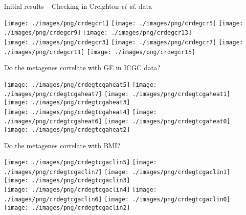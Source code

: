\documentclass[handout]{beamer}
\begin{document}
\begin{frame}{Initial results -- Checking in Creighton \textit{et al.} data}
	\begin{adjustwidth}{-1.5em}{-1.5em}
		\texttt{[image: ./images/png/crdegcr1]}
		\texttt{[image: ./images/png/crdegcr5]}
		\texttt{[image: ./images/png/crdegcr9]}
		\texttt{[image: ./images/png/crdegcr13]}\\
		\texttt{[image: ./images/png/crdegcr3]}
		\texttt{[image: ./images/png/crdegcr7]}
		\texttt{[image: ./images/png/crdegcr11]}
		\texttt{[image: ./images/png/crdegcr15]}
	\end{adjustwidth}
\end{frame}

\begin{frame}{Do the metagenes correlate with GE in ICGC data?}
	\begin{adjustwidth}{-1.5em}{-1.5em}
		\texttt{[image: ./images/png/crdegtcgaheat5]}
		\texttt{[image: ./images/png/crdegtcgaheat7]}
		\texttt{[image: ./images/png/crdegtcgaheat1]}
		\texttt{[image: ./images/png/crdegtcgaheat3]}\\
		\texttt{[image: ./images/png/crdegtcgaheat4]}
		\texttt{[image: ./images/png/crdegtcgaheat6]}
		\texttt{[image: ./images/png/crdegtcgaheat0]}
		\texttt{[image: ./images/png/crdegtcgaheat2]}
	\end{adjustwidth}
\end{frame}

\begin{frame}{Do the metagenes correlate with BMI?}
	\begin{adjustwidth}{-1.5em}{-1.5em}
		\texttt{[image: ./images/png/crdegtcgaclin5]}
		\texttt{[image: ./images/png/crdegtcgaclin7]}
		\texttt{[image: ./images/png/crdegtcgaclin1]}
		\texttt{[image: ./images/png/crdegtcgaclin3]}\\
		\texttt{[image: ./images/png/crdegtcgaclin4]}
		\texttt{[image: ./images/png/crdegtcgaclin6]}
		\texttt{[image: ./images/png/crdegtcgaclin0]}
		\texttt{[image: ./images/png/crdegtcgaclin2]}
	\end{adjustwidth}
\end{frame}
\end{document}
